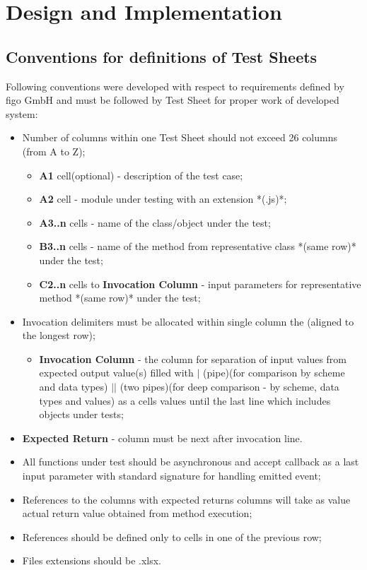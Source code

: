 \chapter{Design and Implementation}
\label{chap:design}

\section{Conventions for definitions of Test Sheets}
\label{sec:convnetions}
Following conventions were developed with respect to requirements defined by figo GmbH and must be followed by Test Sheet for proper work of developed system:
\begin{itemize}
	\item Number of columns within one Test Sheet should not exceed 26 columns (from A to Z);
	\begin{itemize}
		\item \textbf{A1} cell(optional) - description of the test case;
		\item \textbf{A2} cell - module under testing with an extension *(.js)*;
		\item \textbf{A3..n} cells - name of the class/object under the test;
		\item \textbf{B3..n} cells - name of the method from representative class *(same row)* under the test;
		\item \textbf{C2..n} cells to \textbf{Invocation Column}   - input parameters for representative method *(same row)* under the test;
	\end{itemize}
	\item Invocation delimiters must be allocated within single column the (aligned to the longest row);
	\begin{itemize}
		\item \textbf{Invocation Column} - the column for separation of input values from expected output value(s) filled with $|$ (pipe)(for comparison by scheme and data types) $||$ (two pipes)(for deep comparison - by scheme, data types and values) as a cells values until the last line which includes objects under tests;
	\end{itemize}
	\item \textbf{Expected Return} - column must be next after invocation line.
	\item All functions under test should be asynchronous and accept callback as a last input parameter with standard signature for handling emitted event;
	\item References to the columns with expected returns columns will take as value actual return value obtained from method execution;
	\item References should be defined only to cells in one of the previous row;
	\item Files extensions should be .xlsx.
\end{itemize}

